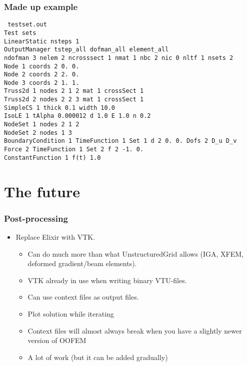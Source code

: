 \documentclass[11pt]{beamer} %
\begin{document}
\begin{frame}
 \frametitle{Made up example}
 \texttt{\footnotesize
  testset.out\\
  Test sets\\
  LinearStatic nsteps 1\\
  OutputManager tstep\_all dofman\_all element\_all\\
  ndofman 3 nelem 2 ncrosssect 1 nmat 1 nbc 2 nic 0 nltf 1 nsets 2\\
  Node 1 coords 2 0. 0.\\
  Node 2 coords 2 2. 0.\\
  Node 3 coords 2 1. 1.\\
  Truss2d 1 nodes 2 1 2 mat 1 crossSect 1\\
  Truss2d 2 nodes 2 2 3 mat 1 crossSect 1\\
  SimpleCS 1 thick 0.1 width 10.0\\
  IsoLE 1  tAlpha 0.000012  d 1.0  E 1.0  n 0.2 \\
  NodeSet 1 nodes 2 1 2\\
  NodeSet 2 nodes 1 3\\
  BoundaryCondition 1 TimeFunction 1 Set 1 d 2 0. 0. Dofs 2 D\_u D\_v\\
  Force 2 TimeFunction 1 Set 2 f 2 -1. 0.\\
  ConstantFunction 1 f(t) 1.0\\
}
\end{frame}

\section{The future}
\begin{frame}
 \frametitle{Post-processing}
 \begin{itemize}
  \item Replace Elixir with VTK.
   \begin{itemize}
    \item[\smiley] Can do much more than what UnstructuredGrid allows (IGA, XFEM, deformed gradient/beam elements).
    \item[\smiley] VTK already in use when writing binary VTU-files.
    \item[\smiley] Can use context files as output files.
    \item[\smiley] Plot solution while iterating
    \item[\frownie] Context files will almost always break when you have a slightly newer version of OOFEM
    \item[\frownie] A lot of work (but it can be added gradually)
   \end{itemize}
 \end{itemize}
\end{frame}
\end{document}
